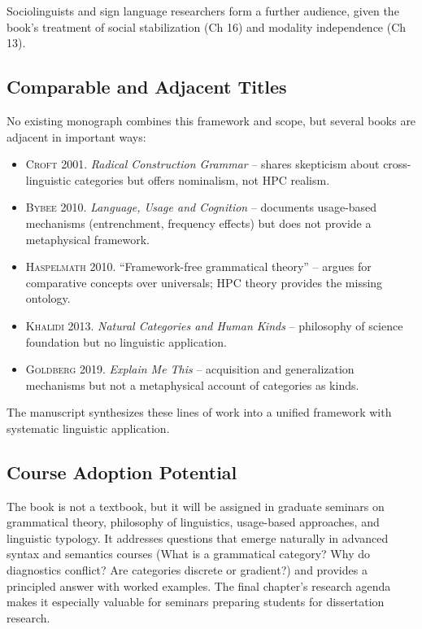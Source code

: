 \documentclass[11pt]{book}
\newcommand{\labelsc}[1]{{\mdseries\textsc{#1}}}
\begin{document}
Sociolinguists and sign language researchers form a further audience, given the book's treatment of social stabilization (Ch 16) and modality independence (Ch 13).

\subsection*{Comparable and Adjacent Titles}

No existing monograph combines this framework and scope, but several books are adjacent in important ways:

\begin{itemize}
  \item \labelsc{Croft 2001.} \emph{Radical Construction Grammar} -- shares skepticism about cross-linguistic categories but offers nominalism, not HPC realism.
  \item \labelsc{Bybee 2010.} \emph{Language, Usage and Cognition} -- documents usage-based mechanisms (entrenchment, frequency effects) but does not provide a metaphysical framework.
  \item \labelsc{Haspelmath 2010.} \enquote{Framework-free grammatical theory} -- argues for comparative concepts over universals; HPC theory provides the missing ontology.
  \item \labelsc{Khalidi 2013.} \emph{Natural Categories and Human Kinds} -- philosophy of science foundation but no linguistic application.
  \item \labelsc{Goldberg 2019.} \emph{Explain Me This} -- acquisition and generalization mechanisms but not a metaphysical account of categories as kinds.
\end{itemize}

The manuscript synthesizes these lines of work into a unified framework with systematic linguistic application.

\subsection*{Course Adoption Potential}

The book is not a textbook, but it will be assigned in graduate seminars on grammatical theory, philosophy of linguistics, usage-based approaches, and linguistic typology. It addresses questions that emerge naturally in advanced syntax and semantics courses (What is a grammatical category? Why do diagnostics conflict? Are categories discrete or gradient?) and provides a principled answer with worked examples. The final chapter's research agenda makes it especially valuable for seminars preparing students for dissertation research.
\end{document}
